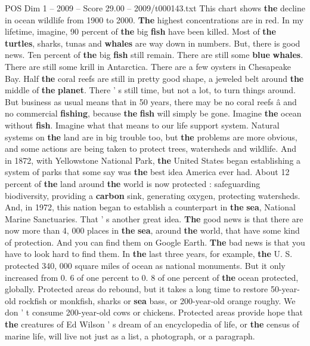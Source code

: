 \begin{textsample}{POS Dim 1 – 2009 – Score 29.00 – 2009/t000143.txt}
This chart shows \textbf{the} decline in ocean wildlife from 1900 to 2000. \textbf{The} highest concentrations are in red.
In my lifetime, imagine, 90 percent of \textbf{the} big \textbf{fish} have been killed.
Most of \textbf{the} \textbf{turtles}, sharks, tunas and \textbf{whales} are way down in numbers.
But, there is good news.
Ten percent of \textbf{the} big \textbf{fish} still remain.
There are still some \textbf{blue} \textbf{whales}.
There are still some krill in Antarctica.
There are a few oysters in Chesapeake Bay.
Half \textbf{the} coral reefs are still in pretty good shape, a jeweled belt around \textbf{the} middle of \textbf{the} \textbf{planet}.
There ' s still time, but not a lot, to turn things around.
But business as usual means that in 50 years, there may be no coral reefs â and no commercial \textbf{fishing}, because \textbf{the} \textbf{fish} will simply be gone.
Imagine \textbf{the} ocean without \textbf{fish}.
Imagine what that means to our life support system.
Natural systems on \textbf{the} land are in big trouble too, but \textbf{the} problems are more obvious, and some actions are being taken to protect trees, watersheds and wildlife.
And in 1872, with Yellowstone National Park, \textbf{the} United States began establishing a system of parks that some say was \textbf{the} best idea America ever had.
About 12 percent of \textbf{the} land around \textbf{the} world is now protected : safeguarding biodiversity, providing a \textbf{carbon} sink, generating oxygen, protecting watersheds.
And, in 1972, this nation began to establish a counterpart in \textbf{the} \textbf{sea}, National Marine Sanctuaries.
That ' s another great idea. \textbf{The} good news is that there are now more than 4, 000 places in \textbf{the} \textbf{sea}, around \textbf{the} world, that have some kind of protection.
And you can find them on Google Earth. \textbf{The} bad news is that you have to look hard to find them.
In \textbf{the} last three years, for example, \textbf{the} U.
S. protected 340, 000 square miles of ocean as national monuments.
But it only increased from 0. 6 of one percent to 0. 8 of one percent of \textbf{the} ocean protected, globally.
Protected areas do rebound, but it takes a long time to restore 50-year-old rockfish or monkfish, sharks or \textbf{sea} bass, or 200-year-old orange roughy.
We don ' t consume 200-year-old cows or chickens.
Protected areas provide hope that \textbf{the} creatures of Ed Wilson ' s dream of an encyclopedia of life, or \textbf{the} census of marine life, will live not just as a list, a photograph, or a paragraph.

\end{textsample}
